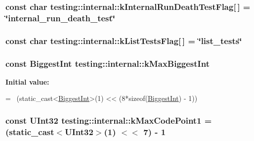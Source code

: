\subsubsection[{\texorpdfstring{k\+Internal\+Run\+Death\+Test\+Flag}{kInternalRunDeathTestFlag}}]{\setlength{\rightskip}{0pt plus 5cm}const char testing\+::internal\+::k\+Internal\+Run\+Death\+Test\+Flag\mbox{[}$\,$\mbox{]} = \char`\"{}internal\+\_\+run\+\_\+death\+\_\+test\char`\"{}}\hypertarget{namespacetesting_1_1internal_a8572303d929880adf30db00952e1c45d}{}\label{namespacetesting_1_1internal_a8572303d929880adf30db00952e1c45d}
\subsubsection[{\texorpdfstring{k\+List\+Tests\+Flag}{kListTestsFlag}}]{\setlength{\rightskip}{0pt plus 5cm}const char testing\+::internal\+::k\+List\+Tests\+Flag\mbox{[}$\,$\mbox{]} = \char`\"{}list\+\_\+tests\char`\"{}}\hypertarget{namespacetesting_1_1internal_a1d3cfebffefbf35f7033d4941493a8ff}{}\label{namespacetesting_1_1internal_a1d3cfebffefbf35f7033d4941493a8ff}
\subsubsection[{\texorpdfstring{k\+Max\+Biggest\+Int}{kMaxBiggestInt}}]{\setlength{\rightskip}{0pt plus 5cm}const {\bf Biggest\+Int} testing\+::internal\+::k\+Max\+Biggest\+Int}\hypertarget{namespacetesting_1_1internal_ad901880198832bc166d2493096b451f7}{}\label{namespacetesting_1_1internal_ad901880198832bc166d2493096b451f7}
{\bfseries Initial value\+:}
\begin{DoxyCode}
=
    ~(\textcolor{keyword}{static\_cast<}\hyperlink{namespacetesting_1_1internal_a05c6bd9ede5ccdf25191a590d610dcc6}{BiggestInt}\textcolor{keyword}{>}(1) << (8*\textcolor{keyword}{sizeof}(\hyperlink{namespacetesting_1_1internal_a05c6bd9ede5ccdf25191a590d610dcc6}{BiggestInt}) - 1))
\end{DoxyCode}
\subsubsection[{\texorpdfstring{k\+Max\+Code\+Point1}{kMaxCodePoint1}}]{\setlength{\rightskip}{0pt plus 5cm}const {\bf U\+Int32} testing\+::internal\+::k\+Max\+Code\+Point1 = (static\+\_\+cast$<${\bf U\+Int32}$>$(1) $<$$<$ 7) -\/ 1}\hypertarget{namespacetesting_1_1internal_a128515c8ed6c0fe98e498c8042da2060}{}\label{namespacetesting_1_1internal_a128515c8ed6c0fe98e498c8042da2060}
